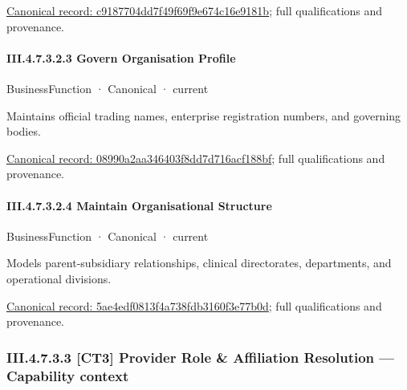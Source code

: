 {\footnotesize \href{../../../../../../../../continuum/business/business-service/c9187704dd7f49f69f9e674c16e9181b.md}{Canonical record: c9187704dd7f49f69f9e674c16e9181b}; full qualifications and provenance.}\par
\paragraph*{III.4.7.3.2.3 Govern Organisation Profile}
\label{navigation:III.4.7.3.2.3}

\label{element:08990a2aa346403f8dd7d716acf188bf}
{\small BusinessFunction · Canonical · current}\par

Maintains official trading names, enterprise registration numbers, and governing bodies.


{\footnotesize \href{../../../../../../../../continuum/business/business-function/08990a2aa346403f8dd7d716acf188bf.md}{Canonical record: 08990a2aa346403f8dd7d716acf188bf}; full qualifications and provenance.}\par
\paragraph*{III.4.7.3.2.4 Maintain Organisational Structure}
\label{navigation:III.4.7.3.2.4}

\label{element:5ae4edf0813f4a738fdb3160f3e77b0d}
{\small BusinessFunction · Canonical · current}\par

Models parent-subsidiary relationships, clinical directorates, departments, and operational divisions.


{\footnotesize \href{../../../../../../../../continuum/business/business-function/5ae4edf0813f4a738fdb3160f3e77b0d.md}{Canonical record: 5ae4edf0813f4a738fdb3160f3e77b0d}; full qualifications and provenance.}\par
\subsubsection*{III.4.7.3.3 [CT3] Provider Role \& Affiliation Resolution — Capability context}
\label{navigation:III.4.7.3.3}

